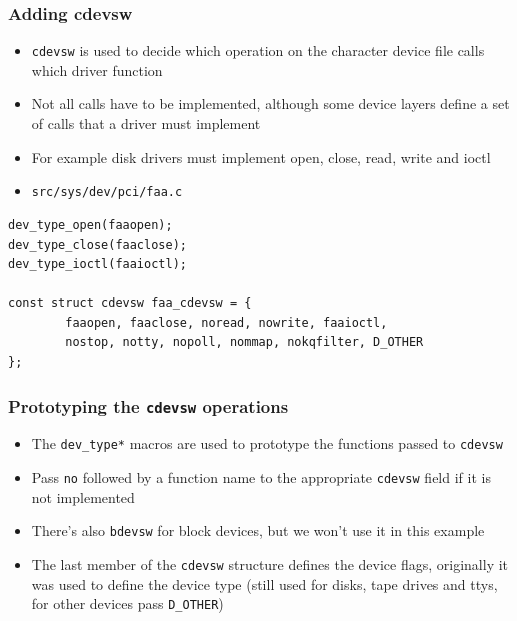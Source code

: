 \documentclass[dvipsnames,table]{beamer}
\begin{document}
\begin{frame}[fragile]
\frametitle{Adding cdevsw}
\begin{itemize}
	\item {\tt cdevsw} is used to decide which operation on the character device file calls which driver function
	\item Not all calls have to be implemented, although some device layers define a set of calls that a driver must implement
	\item For example disk drivers must implement open, close, read, write and ioctl
\end{itemize}
\begin{itemize}
	\item {\tt src/sys/dev/pci/faa.c}
\end{itemize}
\begin{lstlisting}
dev_type_open(faaopen);
dev_type_close(faaclose);
dev_type_ioctl(faaioctl);

const struct cdevsw faa_cdevsw = {
        faaopen, faaclose, noread, nowrite, faaioctl,
        nostop, notty, nopoll, nommap, nokqfilter, D_OTHER
};
\end{lstlisting}
\end{frame}

\begin{frame}
\frametitle{Prototyping the {\tt cdevsw} operations}
\begin{itemize}
	\item The {\tt dev\_type*} macros are used to prototype the functions passed to {\tt cdevsw}
	\item Pass {\tt no} followed by a function name to the appropriate {\tt cdevsw} field if it is not implemented  
	\item There's also {\tt bdevsw} for block devices, but we won't use it in this example
	\item The last member of the {\tt cdevsw} structure defines the device flags, originally it was used to define the device type (still used for disks, tape drives and ttys, for other devices pass {\tt D\_OTHER})
\end{itemize}
\end{frame}
\end{document}
